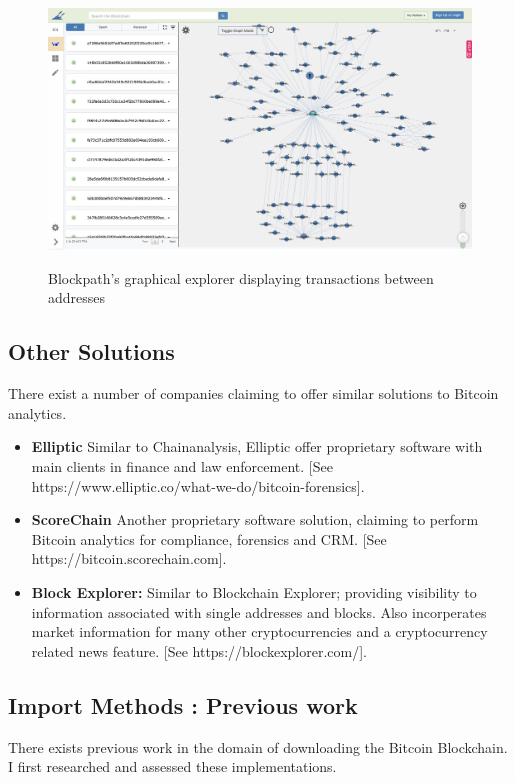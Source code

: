 \begin{figure}
  \centering
  \includegraphics[width = 15cm]{./figures/blockpath}\\[0.5cm] 
  \caption{Blockpath's graphical explorer displaying transactions between addresses \protect \footnotemark}
\end{figure}

\subsection{Other Solutions}

There exist a number of companies claiming to offer similar solutions to Bitcoin analytics. 

\begin{itemize}
    \item \textbf{Elliptic} Similar to Chainanalysis, Elliptic offer proprietary software with main clients in finance and law enforcement. [See https://www.elliptic.co/what-we-do/bitcoin-forensics]. 
    \item \textbf{ScoreChain} Another proprietary software solution, claiming to perform Bitcoin analytics for compliance, forensics and CRM. [See https://bitcoin.scorechain.com]. 
    \item \textbf{Block Explorer:} Similar to Blockchain Explorer; providing visibility to information associated with single addresses and blocks. Also incorperates market information for many other cryptocurrencies and a cryptocurrency related news feature. [See https://blockexplorer.com/]. 

\end{itemize}


\subsection{Import Methods : Previous work}\label{design-db-previous-work}
There exists previous work in the domain of downloading the Bitcoin Blockchain. I first researched and assessed these implementations. 

